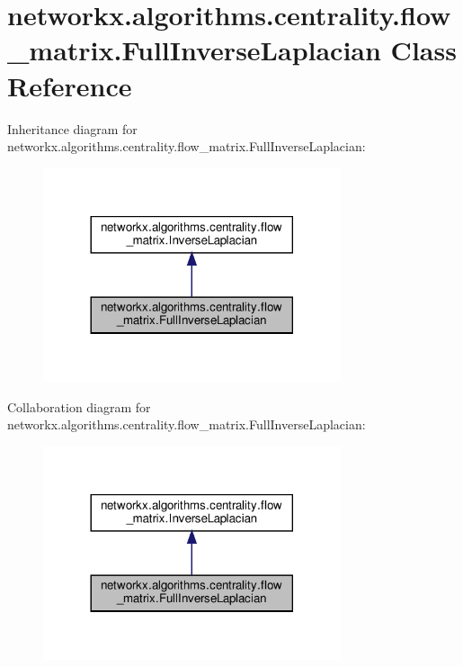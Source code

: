 \hypertarget{classnetworkx_1_1algorithms_1_1centrality_1_1flow__matrix_1_1FullInverseLaplacian}{}\section{networkx.\+algorithms.\+centrality.\+flow\+\_\+matrix.\+Full\+Inverse\+Laplacian Class Reference}
\label{classnetworkx_1_1algorithms_1_1centrality_1_1flow__matrix_1_1FullInverseLaplacian}


Inheritance diagram for networkx.\+algorithms.\+centrality.\+flow\+\_\+matrix.\+Full\+Inverse\+Laplacian\+:
\nopagebreak
\begin{figure}[H]
\begin{center}
\leavevmode
\includegraphics[width=248pt]{classnetworkx_1_1algorithms_1_1centrality_1_1flow__matrix_1_1FullInverseLaplacian__inherit__graph}
\end{center}
\end{figure}


Collaboration diagram for networkx.\+algorithms.\+centrality.\+flow\+\_\+matrix.\+Full\+Inverse\+Laplacian\+:
\nopagebreak
\begin{figure}[H]
\begin{center}
\leavevmode
\includegraphics[width=248pt]{classnetworkx_1_1algorithms_1_1centrality_1_1flow__matrix_1_1FullInverseLaplacian__coll__graph}
\end{center}
\end{figure}

